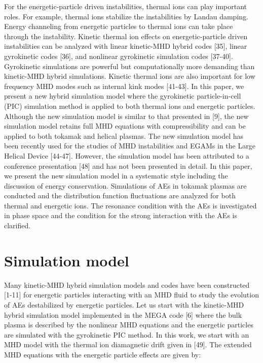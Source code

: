 \documentclass[10pt]{article}
\begin{document}
For the energetic-particle driven instabilities, thermal ions can play important roles. For example, thermal ions stabilize the instabilities by Landau damping. Energy channeling from energetic particles to thermal ions can take place through the instability. Kinetic thermal ion effects on energetic-particle driven instabilities can be analyzed with linear kinetic-MHD hybrid codes [35], linear gyrokinetic codes [36], and nonlinear gyrokinetic simulation codes [37-40]. Gyrokinetic simulations are powerful but computationally more demanding than kinetic-MHD hybrid simulations. Kinetic thermal ions are also important for low frequency MHD modes such as internal kink modes [41-43]. In this paper, we present a new hybrid simulation model where the gyrokinetic particle-in-cell (PIC) simulation method is applied to both thermal ions and energetic particles. Although the new simulation model is similar to that presented in [9], the new simulation model retains full MHD equations with compressibility and can be applied to both tokamak and helical plasmas. The new simulation model has been recently used for the studies of MHD instabilities and EGAMs in the Large Helical Device [44-47]. However, the simulation model has been attributed to a conference presentation [48] and has not been presented in detail. In this paper, we present the new simulation model in a systematic style including the discussion of energy conservation. Simulations of AEs in tokamak plasmas are conducted and the distribution function fluctuations are analyzed for both thermal and energetic ions. The resonance condition with the AEs is investigated in phase space and the condition for the strong interaction with the AEs is clarified.

\section{Simulation model}
Many kinetic-MHD hybrid simulation models and codes have been constructed [1-11] for energetic particles interacting with an MHD fluid to study the evolution of AEs destabilized by energetic particles. Let us start with the kinetic-MHD hybrid simulation model implemented in the MEGA code [6] where the bulk plasma is described by the nonlinear MHD equations and the energetic particles are simulated with the gyrokinetic PIC method. In this work, we start with an MHD model with the thermal ion diamagnetic drift given in [49]. The extended MHD equations with the energetic particle effects are given by:
\end{document}
